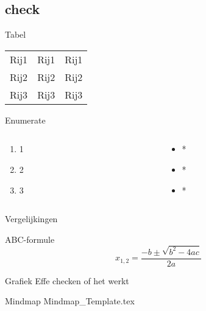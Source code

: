 \subsection{check}
\begin{frame}{Tabel}
\begin{center}
%
\begin{tabular}{@{}*3l@{}}
\rowcolor{gray!80} Rij1 & Rij1 & Rij1\\
\rowcolor{gray!40} Rij2 & Rij2 & Rij2 \\
\rowcolor{gray!40} Rij3 & Rij3 & Rij3 \\
\end{tabular}
%
\end{center}
\end{frame}
%
\begin{frame}{Enumerate}
\begin{columns}
\begin{column}{.5\textwidth}
\begin{enumerate}
\item 1
\item 2
\item 3
\end{enumerate}
\end{column}
%
\begin{column}{.5\textwidth}
\begin{itemize}
\item *
\item *
\item *
\end{itemize}
\end{column}
\end{columns}
\end{frame}
\begin{frame}{Vergelijkingen}
\begin{block}{ABC-formule}
\begin{equation}
x_{1,2}=\frac{-b\pm\sqrt{b^2-4ac}}{2a}
\end{equation}
\end{block}
\end{frame}
%
\begin{frame}{Grafiek}
Effe checken of het werkt 
\end{frame}
%
\begin{frame}{Mindmap}
{Mindmap_Template.tex}
\end{frame}


